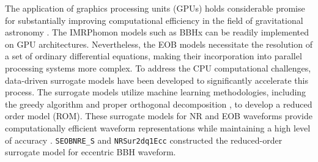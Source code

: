 \documentclass[
reprint,
superscriptaddress,
amsmath,amssymb,
aps,
prd,
floatfix,
]{revtex4-2}
\begin{document}
The application of graphics processing units (GPUs) holds considerable promise for substantially improving computational efficiency in the field of gravitational astronomy \cite{katzGPUacceleratedMassiveBlack2020a, katzAssessingDataanalysisImpact2022, strubAcceleratingGlobalParameter2023}. 
The IMRPhomon models such as BBHx \cite{katzGPUacceleratedMassiveBlack2020a, katzFullyAutomatedEndtoend2022} can be readily implemented on GPU architectures.
Nevertheless, the EOB models necessitate the resolution of a set of ordinary differential equations, making their incorporation into parallel processing systems more complex.
To address the CPU computational challenges, data-driven surrogate models have been developed to significantly accelerate this process.
The surrogate models utilize machine learning methodologies, including the greedy algorithm \cite{fieldFastPredictionEvaluation2014} and proper orthogonal decomposition \cite{chatterjeeIntroductionProperOrthogonal2000, tiglioReducedOrderSurrogate2022}, to develop a reduced order model (ROM).  
These surrogate models for NR and EOB waveforms provide computationally efficient waveform representations while maintaining a high level of accuracy \cite{blackmanSurrogateModelGravitational2017, varmaSurrogateModelsPrecessing2019, islamEccentricBinaryBlack2021,yunSurrogateModelGravitational2021}.
\texttt{SEOBNRE\_S}\cite{yunSurrogateModelGravitational2021} and \texttt{NRSur2dq1Ecc} \cite{islamEccentricBinaryBlack2021} constructed the reduced-order surrogate model  for eccentric BBH waveform.
\end{document}
